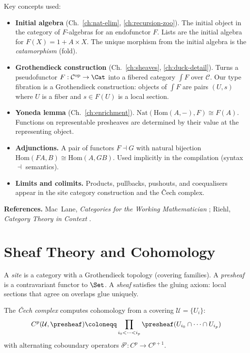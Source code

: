 Key concepts used:
\begin{itemize}
  \item \textbf{Initial algebra} (Ch.~\ref{ch:nat-elim},
    \ref{ch:recursion-zoo}).
    The initial object in the category of $F$-algebras for an
    endofunctor $F$.  Lists are the initial algebra for
    $F(X) = 1 + A \times X$.  The unique morphism from the
    initial algebra is the \emph{catamorphism} (fold).

  \item \textbf{Grothendieck construction}
    (Ch.~\ref{ch:sheaves}, \ref{ch:duck-detail}).
    Turns a pseudofunctor
    $F : \mathcal{C}^{\mathrm{op}} \to \Cat$ into a fibered category
    $\int F$ over $\mathcal{C}$.  Our type fibration is a Grothendieck
    construction: objects of $\int F$ are pairs $(U, s)$ where $U$ is
    a fiber and $s \in F(U)$ is a local section.

  \item \textbf{Yoneda lemma} (Ch.~\ref{ch:enrichment}).
    $\mathrm{Nat}(\mathrm{Hom}(A, -), F)
    \cong F(A)$.  Functions on representable presheaves are determined
    by their value at the representing object.

  \item \textbf{Adjunctions.}
    A pair of functors $F \dashv G$ with natural bijection
    $\mathrm{Hom}(FA, B) \cong \mathrm{Hom}(A, GB)$.
    Used implicitly in the compilation (syntax $\dashv$ semantics).

  \item \textbf{Limits and colimits.}
    Products, pullbacks, pushouts, and coequalisers appear in the
    site category construction and the \v{C}ech complex.
\end{itemize}

\noindent
\textbf{References.}
Mac~Lane, \emph{Categories for the Working Mathematician}
\cite{maclane1971};
Riehl, \emph{Category Theory in Context} \cite{riehl2017}.

\section{Sheaf Theory and Cohomology}

A \emph{site} is a category with a Grothendieck topology (covering
families).  A \emph{presheaf} is a contravariant functor to $\Set$.
A \emph{sheaf} satisfies the gluing axiom: local sections that agree
on overlaps glue uniquely.

The \emph{\v{C}ech complex} computes cohomology from a covering
$\mathcal{U} = \{U_i\}$:
\[
  C^p(\mathcal{U}, \presheaf) \coloneqq
  \prod_{i_0 < \cdots < i_p} \presheaf(U_{i_0} \cap \cdots \cap U_{i_p})
\]
with alternating coboundary operators $\delta^p : C^p \to C^{p+1}$.

